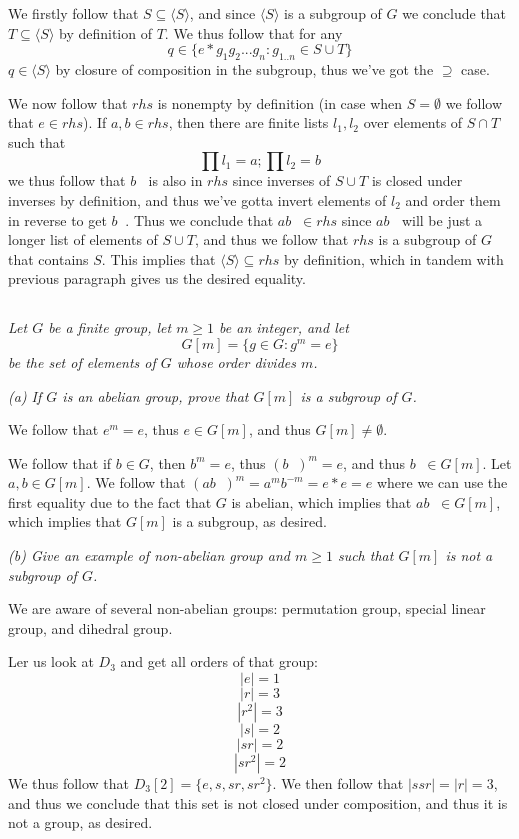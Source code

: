 \documentclass[11pt,oneside,titlepage]{book}
\DeclareMathOperator \inv {^{-1}}
\newcommand{\eangle}[1]{\langle #1 \rangle}
\newcommand{\set}[1]{\{ #1 \}}
\begin{document}
We firstly follow that $S \subseteq \eangle{S}$, and since
$\eangle{S}$ is a subgroup of $G$ we conclude that $T \subseteq
\eangle{S}$ by definition of $T$. We thus follow that for any
$$q \in \set{e * g_1 g_2 ... g_n: g_{1..n} \in S \cup T}$$
$q \in \eangle{S}$ by closure of composition in the subgroup, thus
we've got the $\supseteq$ case.

We now follow that $rhs$ is nonempty by definition (in case when $S =
\emptyset$ we follow that $e \in rhs$). If $a, b \in rhs$, then
there are finite lists $l_1, l_2$ over elements of $S \cap T$ such that
$$\prod{l_1} = a; \prod{l_2} = b$$
we thus follow that $b\inv$ is also in $rhs$ since inverses of $S \cup
T$ is closed under inverses by definition, and thus we've gotta invert
elements of $l_2$ and order them in reverse to get $b\inv$. Thus we conclude
that $a b\inv \in rhs$ since $a b\inv$ will be just a longer list of
elements of $S \cup T$, and thus we follow that $rhs$ is a subgroup of $G$ that
contains $S$. This implies that $\eangle{S} \subseteq rhs$ by definition, which
in tandem with previous paragraph gives us the desired equality.

\subsection{}

\textit{Let $G$ be a finite group, let $m \geq 1$ be an integer, and let
  $$G[m] = \set{g \in G: g^m = e}$$
  be the set of elements of $G$ whose order divides $m$. }

\textit{(a) If $G$ is an abelian group, prove that $G[m]$ is a subgroup of $G$.}

We follow that $e^m = e$, thus $e \in G[m]$, and thus $G[m] \neq
\emptyset$.

We follow that if $b \in G$, then $b^m = e$, thus $(b\inv)^m = e$, and
thus $b\inv \in G[m]$.  Let $a, b \in G[m]$. We follow that $(a b\inv
)^m = a^m b^{-m} = e * e = e$ where we can use the first equality due
to the fact that $G$ is abelian, which implies that $ab\inv \in G[m]$,
which implies that $G[m]$ is a subgroup, as desired.

\textit{(b) Give an example of non-abelian group and $m \geq 1$ such
  that $G[m]$ is not a subgroup of $G$.}

We are aware of several non-abelian groups: permutation group, special
linear group, and dihedral group.

Ler us look at $D_3$ and get all orders of that group:
$$|e| = 1$$
$$|r| = 3$$
$$|r^2| = 3$$
$$|s| = 2$$
$$|sr| = 2$$
$$|sr^2| = 2$$
We thus follow that $D_3[2] = \set{e, s, sr, sr^2}$. We then follow
that $|s sr| = |r| = 3$, and thus we conclude that this set is not
closed under composition, and thus it is not a group, as desired.
\end{document}
